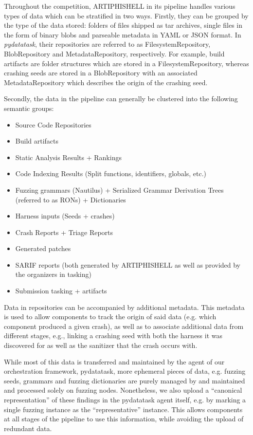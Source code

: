 Throughout the competition, ARTIPHISHELL in its pipeline handles various types of data which can be stratified in two ways.
Firstly, they can be grouped by the type of the data stored: folders of files shipped as tar archives, single files in the form of binary blobs and parseable metadata in YAML or JSON format.
In \textit{pydatatask}, their repositories are referred to as FilesystemRepository, BlobRepository and MetadataRepository, respectively.
For example, build artifacts are folder structures which are stored in a FilesystemRepository, whereas crashing seeds are stored in a BlobRepository with an associated MetadataRepository which describes the origin of the crashing seed.

Secondly, the data in the pipeline can generally be clustered into the following semantic groups:

\begin{itemize}
    \item Source Code Repositories
    \item Build artifacts
    \item Static Analysis Results + Rankings
    \item Code Indexing Results (Split functions, identifiers, globals, etc.)
    \item Fuzzing grammars (Nautilus) + Serialized Grammar Derivation Trees (referred to as RONs) + Dictionaries
    \item Harness inputs (Seeds + crashes)
    \item Crash Reports + Triage Reports
    \item Generated patches
    \item SARIF reports (both generated by ARTIPHISHELL as well as provided by the organizers in tasking)
    \item Submission tasking + artifacts
\end{itemize}

Data in repositories can be accompanied by additional metadata.
This metadata is used to allow components to track the origin of said data (e.g. which component produced a given crash),
as well as to associate additional data from different stages, e.g., linking a crashing seed with both the harness
it was discovered for as well as the sanitizer that the crash occurs with.

While most of this data is transferred and maintained by the agent of our orchestration framework, pydatatask, more ephemeral
pieces of data, e.g. fuzzing seeds, grammars and fuzzing dictionaries are purely managed by \seedsync and maintained and processed solely on fuzzing nodes.
Nonetheless, we also upload a ``canonical representation'' of these findings in the pydatatask agent itself, e.g. by marking a single fuzzing instance as the ``representative'' instance.
This allows components at all stages of the pipeline to use this information, while avoiding the upload of redundant data.


